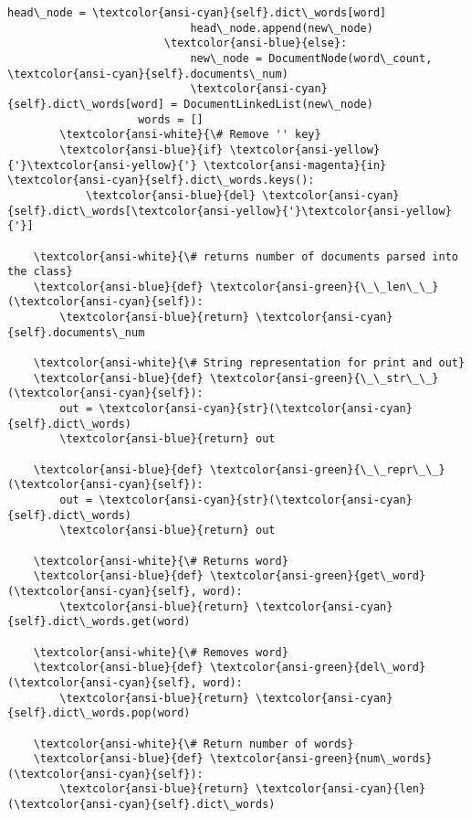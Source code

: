 \documentclass[11pt]{article}
\begin{document}
\begin{Verbatim}[commandchars=\\\{\}]
                            head\_node = \textcolor{ansi-cyan}{self}.dict\_words[word]
                            head\_node.append(new\_node)
                        \textcolor{ansi-blue}{else}:
                            new\_node = DocumentNode(word\_count, \textcolor{ansi-cyan}{self}.documents\_num)
                            \textcolor{ansi-cyan}{self}.dict\_words[word] = DocumentLinkedList(new\_node)
                    words = []
        \textcolor{ansi-white}{\# Remove '' key}
        \textcolor{ansi-blue}{if} \textcolor{ansi-yellow}{'}\textcolor{ansi-yellow}{'} \textcolor{ansi-magenta}{in} \textcolor{ansi-cyan}{self}.dict\_words.keys():
            \textcolor{ansi-blue}{del} \textcolor{ansi-cyan}{self}.dict\_words[\textcolor{ansi-yellow}{'}\textcolor{ansi-yellow}{'}]

    \textcolor{ansi-white}{\# returns number of documents parsed into the class}
    \textcolor{ansi-blue}{def} \textcolor{ansi-green}{\_\_len\_\_}(\textcolor{ansi-cyan}{self}):
        \textcolor{ansi-blue}{return} \textcolor{ansi-cyan}{self}.documents\_num

    \textcolor{ansi-white}{\# String representation for print and out}
    \textcolor{ansi-blue}{def} \textcolor{ansi-green}{\_\_str\_\_}(\textcolor{ansi-cyan}{self}):
        out = \textcolor{ansi-cyan}{str}(\textcolor{ansi-cyan}{self}.dict\_words)
        \textcolor{ansi-blue}{return} out

    \textcolor{ansi-blue}{def} \textcolor{ansi-green}{\_\_repr\_\_}(\textcolor{ansi-cyan}{self}):
        out = \textcolor{ansi-cyan}{str}(\textcolor{ansi-cyan}{self}.dict\_words)
        \textcolor{ansi-blue}{return} out

    \textcolor{ansi-white}{\# Returns word}
    \textcolor{ansi-blue}{def} \textcolor{ansi-green}{get\_word}(\textcolor{ansi-cyan}{self}, word):
        \textcolor{ansi-blue}{return} \textcolor{ansi-cyan}{self}.dict\_words.get(word)

    \textcolor{ansi-white}{\# Removes word}
    \textcolor{ansi-blue}{def} \textcolor{ansi-green}{del\_word}(\textcolor{ansi-cyan}{self}, word):
        \textcolor{ansi-blue}{return} \textcolor{ansi-cyan}{self}.dict\_words.pop(word)

    \textcolor{ansi-white}{\# Return number of words}
    \textcolor{ansi-blue}{def} \textcolor{ansi-green}{num\_words}(\textcolor{ansi-cyan}{self}):
        \textcolor{ansi-blue}{return} \textcolor{ansi-cyan}{len}(\textcolor{ansi-cyan}{self}.dict\_words)


\end{Verbatim}
\end{document}
